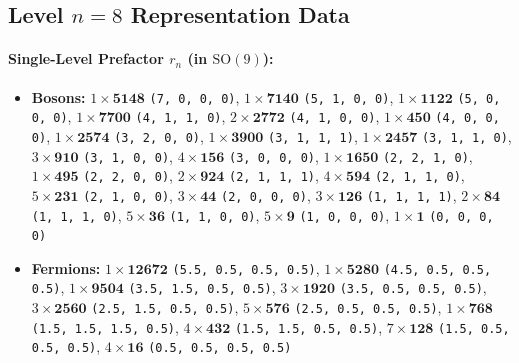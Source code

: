 \documentclass[11pt,a4paper]{article}
\begin{document}
\subsection{Level $n = 8$ Representation Data}
\paragraph{Single-Level Prefactor $r_n$ (in $\mathrm{SO}(9)$):}
\begin{itemize}
    \item \textbf{Bosons:} $1 \times \mathbf{5148}$ \texttt{(7, 0, 0, 0)}, $1 \times \mathbf{7140}$ \texttt{(5, 1, 0, 0)}, $1 \times \mathbf{1122}$ \texttt{(5, 0, 0, 0)}, $1 \times \mathbf{7700}$ \texttt{(4, 1, 1, 0)}, $2 \times \mathbf{2772}$ \texttt{(4, 1, 0, 0)}, $1 \times \mathbf{450}$ \texttt{(4, 0, 0, 0)}, $1 \times \mathbf{2574}$ \texttt{(3, 2, 0, 0)}, $1 \times \mathbf{3900}$ \texttt{(3, 1, 1, 1)}, $1 \times \mathbf{2457}$ \texttt{(3, 1, 1, 0)}, $3 \times \mathbf{910}$ \texttt{(3, 1, 0, 0)}, $4 \times \mathbf{156}$ \texttt{(3, 0, 0, 0)}, $1 \times \mathbf{1650}$ \texttt{(2, 2, 1, 0)}, $1 \times \mathbf{495}$ \texttt{(2, 2, 0, 0)}, $2 \times \mathbf{924}$ \texttt{(2, 1, 1, 1)}, $4 \times \mathbf{594}$ \texttt{(2, 1, 1, 0)}, $5 \times \mathbf{231}$ \texttt{(2, 1, 0, 0)}, $3 \times \mathbf{44}$ \texttt{(2, 0, 0, 0)}, $3 \times \mathbf{126}$ \texttt{(1, 1, 1, 1)}, $2 \times \mathbf{84}$ \texttt{(1, 1, 1, 0)}, $5 \times \mathbf{36}$ \texttt{(1, 1, 0, 0)}, $5 \times \mathbf{9}$ \texttt{(1, 0, 0, 0)}, $1 \times \mathbf{1}$ \texttt{(0, 0, 0, 0)}
    \item \textbf{Fermions:} $1 \times \mathbf{12672}$ \texttt{(5.5, 0.5, 0.5, 0.5)}, $1 \times \mathbf{5280}$ \texttt{(4.5, 0.5, 0.5, 0.5)}, $1 \times \mathbf{9504}$ \texttt{(3.5, 1.5, 0.5, 0.5)}, $3 \times \mathbf{1920}$ \texttt{(3.5, 0.5, 0.5, 0.5)}, $3 \times \mathbf{2560}$ \texttt{(2.5, 1.5, 0.5, 0.5)}, $5 \times \mathbf{576}$ \texttt{(2.5, 0.5, 0.5, 0.5)}, $1 \times \mathbf{768}$ \texttt{(1.5, 1.5, 1.5, 0.5)}, $4 \times \mathbf{432}$ \texttt{(1.5, 1.5, 0.5, 0.5)}, $7 \times \mathbf{128}$ \texttt{(1.5, 0.5, 0.5, 0.5)}, $4 \times \mathbf{16}$ \texttt{(0.5, 0.5, 0.5, 0.5)}
\end{itemize}
\end{document}
